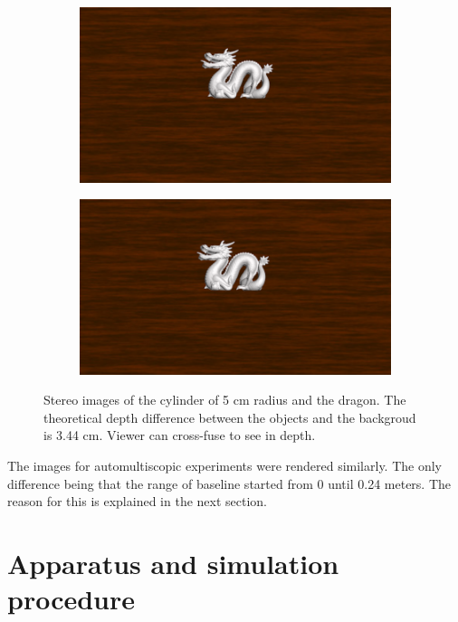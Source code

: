 \begin{figure}[htbp]
    \begin{subfigure}[b]{0.5\textwidth}
        \includegraphics[width=\textwidth]{./Template_Figures/57Ld.png}
        \caption{}\label{fig:left_stereo_dra}
    \end{subfigure}
    \begin{subfigure}[b]{0.5\textwidth}
        \includegraphics[width=\textwidth]{./Template_Figures/57Rd.png}
        \caption{}\label{fig:right_stereo_dra}
    \end{subfigure}
    \caption{Stereo images of the cylinder of 5 cm radius and the dragon. The theoretical depth difference between the objects and the backgroud is 3.44 cm. Viewer can cross-fuse to see in depth.\label{fig:stimuli_stereo}}
\end{figure}

The images for automultiscopic experiments were rendered similarly. The only difference being that the range of baseline started from 0 until 0.24 meters. The reason for this is explained in the next section.


\section{Apparatus and simulation procedure}

